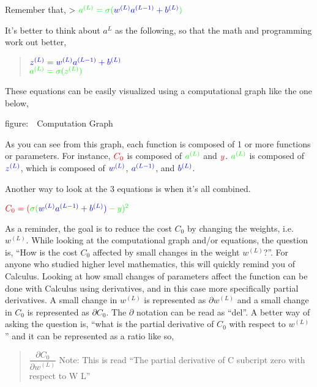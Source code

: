 \documentclass[11pt]{article}
\begin{document}
Remember that, \textgreater{}
\(\color{green}{ a^{(L)} } = \color{green}{ \sigma( } \color{blue}{ w^{(L)}a^{(L-1)}+b^{(L)} } \color{green}{ ) }\)

It's better to think about \(a^{L}\) as the following, so that the math
and programming work out better,

\begin{quote}
\(\color{blue}{ z^{(L)} = w^{(L)}a^{(L-1)}+b^{(L)} }\)\\
\(\color{green}{ a^{(L)} = \sigma(z^{(L)}) }\)
\end{quote}

These equations can be easily visualized using a computational graph
like the one below,

figure:~~Computation Graph

As you can see from this graph, each function is composed of 1 or more
functions or parameters. For instance, \(\color{red}{ C_0 }\) is
composed of \(\color{green}{ a^{(L)} }\) and \(\color{red}{ y }\).
\(\color{green}{ a^{(L)} }\) is composed of \(\color{blue}{ z^{(L)} }\),
which is composed of \(\color{blue}{ w^{(L)} }\),
\(\color{blue}{ a^{(L-1)} }\), and \(\color{blue}{ b^{(L)} }\).

Another way to look at the 3 equations is when it's all combined.

\(\color{red}{ C_0 = (\color{green}{ \sigma(\color{blue}{ w^{(L)}a^{(L-1)}+b^{(L)} }) } - y)^{2} }\)

As a reminder, the goal is to reduce the cost \(C_0\) by changing the
weights, i.e. \(w^{(L)}\). While looking at the computational graph
and/or equations, the question is, ``How is the cost \(C_0\) affected by
small changes in the weight \(w^{(L)}\)?''. For anyone who studied
higher level mathematics, this will quickly remind you of Calculus.
Looking at how small changes of parameters affect the function can be
done with Calculus using derivatives, and in this case more specifically
partial derivatives. A small change in \(w^{(L)}\) is represented as
\(\partial w^{(L)}\) and a small change in \(C_0\) is represented as
\(\partial C_0\). The \(\partial\) notation can be read as ``del''. A
better way of asking the question is, ``what is the partial derivative
of \(C_0\) with respect to \(w^{(L)}\)'' and it can be represented as a
ratio like so,

\begin{quote}
\(\dfrac{\partial C_0}{\partial w^{(L)}}\) Note: This is read ``The
partial derivative of C subcript zero with respect to W L''
\end{quote}
\end{document}
